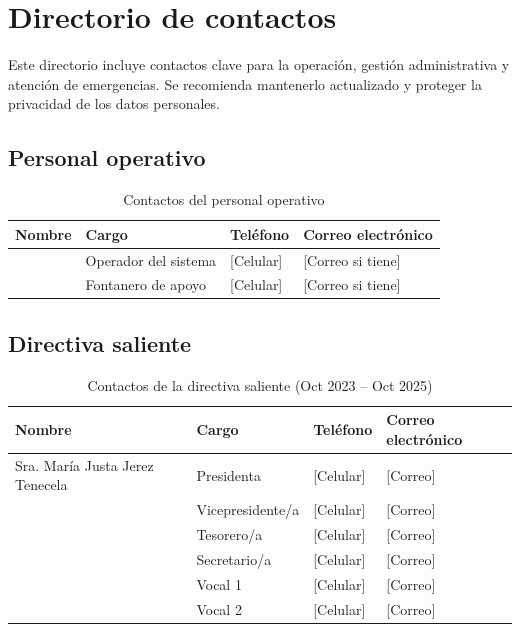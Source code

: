 \section{Directorio de contactos}

Este directorio incluye contactos clave para la operación, gestión administrativa y atención de emergencias. Se recomienda mantenerlo actualizado y proteger la privacidad de los datos personales.

\subsection*{Personal operativo}

\begin{table}[H]
\centering
\caption{Contactos del personal operativo}
\label{tab:contactos-operativo}
\begin{tabularx}{\textwidth}{@{}lllX@{}}
\toprule
\textbf{Nombre} & \textbf{Cargo} & \textbf{Teléfono} & \textbf{Correo electrónico} \\
\midrule
[Nombre operador] & Operador del sistema & [Celular] & [Correo si tiene] \\
[Nombre fontanero] & Fontanero de apoyo & [Celular] & [Correo si tiene] \\
\bottomrule
\end{tabularx}
\end{table}

\subsection*{Directiva saliente}

\begin{table}[H]
\centering
\caption{Contactos de la directiva saliente (Oct 2023 -- Oct 2025)}
\label{tab:contactos-directiva-saliente}
\begin{tabularx}{\textwidth}{@{}lllX@{}}
\toprule
\textbf{Nombre} & \textbf{Cargo} & \textbf{Teléfono} & \textbf{Correo electrónico} \\
\midrule
Sra. María Justa Jerez Tenecela & Presidenta & [Celular] & [Correo] \\
[Nombre] & Vicepresidente/a & [Celular] & [Correo] \\
[Nombre] & Tesorero/a & [Celular] & [Correo] \\
[Nombre] & Secretario/a & [Celular] & [Correo] \\
[Nombre] & Vocal 1 & [Celular] & [Correo] \\
[Nombre] & Vocal 2 & [Celular] & [Correo] \\
\bottomrule
\end{tabularx}
\end{table}

